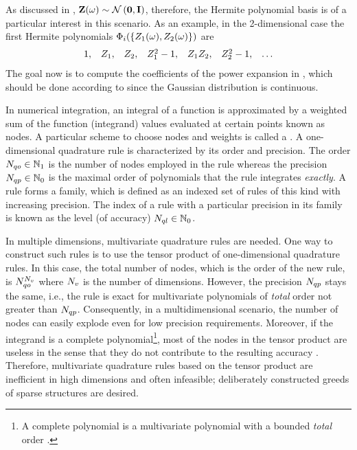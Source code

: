 As discussed in , $\vZ(\o) \sim \normal{\vZero}{\mI}$, therefore, the Hermite polynomial basis is of a particular interest in this scenario. As an example, in the 2-dimensional case the first Hermite polynomials $\Phi_i(\{ Z_1(\omega), Z_2(\omega) \})$ are
\[
  \begin{array}{lllllll}
  1, & Z_1, & Z_2, & Z_1^2 - 1, & Z_1 Z_2, & Z_2^2 - 1, & \dotsc
  \end{array}
\]
The goal now is to compute the coefficients of the power expansion in , which should be done according to  since the Gaussian distribution is continuous.

In numerical integration, an integral of a function is approximated by a weighted sum of the function (integrand) values evaluated at certain points known as nodes. A particular scheme to choose nodes and weights is called a . A one-dimensional quadrature rule is characterized by its order and precision. The order $N_{qo} \in \mathbb{N}_{1}$ is the number of nodes employed in the rule whereas the precision $N_{qp} \in \mathbb{N}_{0}$ is the maximal order of polynomials that the rule integrates \emph{exactly}. A rule forms a family, which is defined as an indexed set of rules of this kind with increasing precision. The index of a rule with a particular precision in its family is known as the level (of accuracy) $N_{ql} \in \mathbb{N}_{0}$.

In multiple dimensions, multivariate quadrature rules are needed. One way to construct such rules is to use the tensor product of one-dimensional quadrature rules. In this case, the total number of nodes, which is the order of the new rule, is $N_{qo}^{N_v}$ where ${N_v}$ is the number of dimensions. However, the precision $N_{qp}$ stays the same, i.e., the rule is exact for multivariate polynomials of \emph{total} order not greater than $N_{qp}$. Consequently, in a multidimensional scenario, the number of nodes can easily explode even for low precision requirements. Moreover, if the integrand is a complete polynomial\footnote{A complete polynomial is a multivariate polynomial with a bounded \emph{total} order \cite{heiss2008}.}, most of the nodes in the tensor product are useless in the sense that they do not contribute to the resulting accuracy \cite{heiss2008}. Therefore, multivariate quadrature rules based on the tensor product are inefficient in high dimensions and often infeasible; deliberately constructed greeds of sparse structures are desired.

